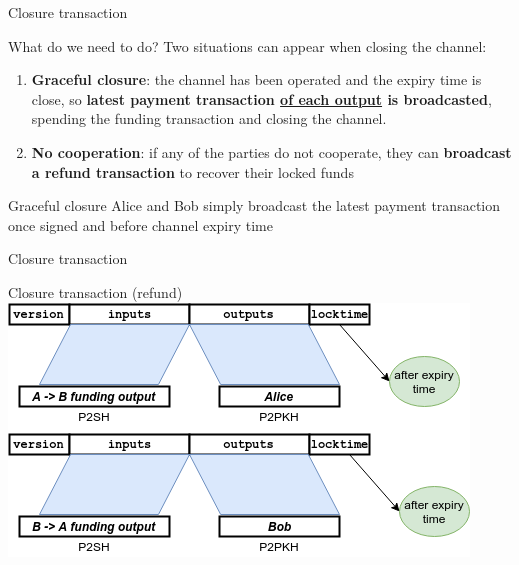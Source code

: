 \documentclass{beamer}
\begin{document}
\begin{frame}{Closure transaction}
 \begin{block}{What do we need to do?}
  Two situations can appear when closing the channel:
  \begin{enumerate}
   \item \textbf{Graceful closure}: the channel has been operated and the expiry time is close, so \textbf{latest payment transaction \underline{of each output} is broadcasted}, spending the funding transaction and closing the channel.
   \item \textbf{No cooperation}: if any of the parties do not cooperate, they can \textbf{broadcast a refund transaction} to recover their locked funds
  \end{enumerate}
 \end{block}
 \pause
 \begin{exampleblock}{Graceful closure}
  Alice and Bob simply broadcast the latest payment transaction once signed and before channel expiry time
 \end{exampleblock}
\end{frame}
\begin{frame}{Closure transaction}
 \begin{exampleblock}{Closure transaction (refund)}
  \includegraphics[width=\textwidth, height=0.8\textheight, keepaspectratio]{img/bidir_tx_refund.png}
 \end{exampleblock}
\end{frame}
\end{document}
